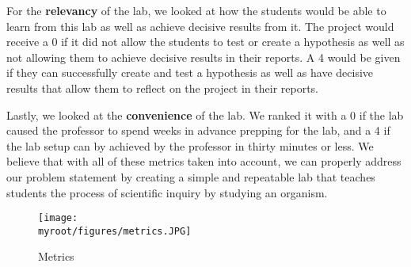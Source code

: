 \documentclass[twocolumn,10pt]{IEEEtran}
\newcommand{\myroot}{.}
\begin{document}
For the \textbf{relevancy} of the lab, we looked at how the students would be able to learn from this lab as well as achieve decisive results from it. The project would receive a 0 if it did not allow the students to test or create a hypothesis as well as not allowing them to achieve decisive results in their reports. A 4 would be given if they can successfully create and test a hypothesis as well as have decisive results that allow them to reflect on the project in their reports. 

Lastly, we looked at the \textbf{convenience} of the lab. We ranked it with a 0 if the lab caused the professor to spend weeks in advance prepping for the lab, and a 4 if the lab setup can by achieved by the professor in thirty minutes or less. We believe that with all of these metrics taken into account, we can properly address our problem statement by creating a simple and repeatable lab that teaches students the process of scientific inquiry by studying an organism.
\begin{figure}[ht!]
\centering
\texttt{[image: \\myroot/figures/metrics.JPG]}
\caption{Metrics}
\label{fig:metrics}
\end{figure}
\end{document}
